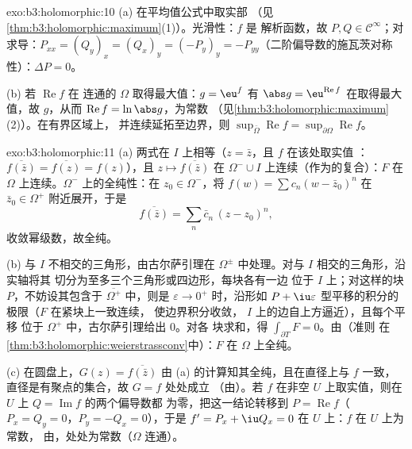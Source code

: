 \begin{solution}{exo:b3:holomorphic:10}
(a) 在平均值公式中取实部
（见\cref{thm:b3:holomorphic:maximum}(1)）。光滑性：$f$ 是
解析函数，故 $P, Q \in \mathcal C^\infty$；对
求导：$P_{xx} = (Q_y)_x = (Q_x)_y = (-P_y)_y =
-P_{yy}$（二阶偏导数的施瓦茨对称性）：$\Delta P =
0$。

(b) 若 $\operatorname{Re}f$ 在
连通的 $\Omega$ 取得最大值：$g = \eu^f$ 有 $\abs g =
\eu^{\operatorname{Re}f}$ 在取得最大值，故
$g$，从而 $\operatorname{Re}f = \ln\abs g$，为常数
（见\cref{thm:b3:holomorphic:maximum}(2)）。在有界区域上，
并连续延拓至边界，则
$\sup_{\bar\Omega}\operatorname{Re}f =
\sup_{\partial\Omega}\operatorname{Re}f$。
\end{solution}

\begin{solution}{exo:b3:holomorphic:11}
(a) 两式在 $I$ 上相等（$z = \bar z$，且 $f$ 在该处取实值
：$\overline{f(\bar z)} = \overline{f(z)} = f(z)$），且
$z \mapsto \overline{f(\bar z)}$ 在
$\Omega^-\cup I$ 上连续（作为的复合）：$F$ 在
$\Omega$ 上连续。$\Omega^-$ 上的全纯性：在 $z_0
\in \Omega^-$，将 $f(w) = \sum c_n(w - \bar z_0)^n$ 在
$\bar z_0 \in \Omega^+$ 附近展开，于是
\[
\overline{f(\bar z)} = \sum_n\bar c_n\,(z - z_0)^n,
\]
收敛幂级数，故全纯。

(b) 与 $I$ 不相交的三角形，由古尔萨引理在
$\Omega^\pm$ 中处理。对与 $I$ 相交的三角形，沿实轴将其
切分为至多三个三角形或四边形，每块各有一边
位于 $I$ 上；对这样的块 $P$，不妨设其包含于
$\overline{\Omega^+}$ 中，则是
$\varepsilon \to 0^+$ 时，沿形如 $P + \iu
\varepsilon$ 型平移的积分的极限（$F$ 在紧块上一致连续，
使边界积分收敛，
$I$ 上的边自上方逼近），且每个平移
位于 $\Omega^+$ 中，古尔萨引理给出 $0$。对各
块求和，得 $\int_{\partial T}F = 0$。由（准则
在\cref{thm:b3:holomorphic:weierstrassconv}中）：$F$ 在
$\Omega$ 上全纯。

(c) 在圆盘上，$G(z) = \overline{f(\bar z)}$
由 (a) 的计算知其全纯，且在直径上与 $f$
一致，直径是有聚点的集合，故 $G = f$ 处处成立
（由）。若 $f$ 在非空
$U$ 上取实值，则在 $U$ 上 $Q = \operatorname{Im}f$ 的两个偏导数都
为零，把这一结论转移到 $P =
\operatorname{Re}f$（$P_x = Q_y = 0$，$P_y = -Q_x = 0$），于是
$f' = P_x + \iu Q_x = 0$ 在 $U$ 上：$f$ 在 $U$ 上为常数，
由，处处为常数（$\Omega$
连通）。
\end{solution}

